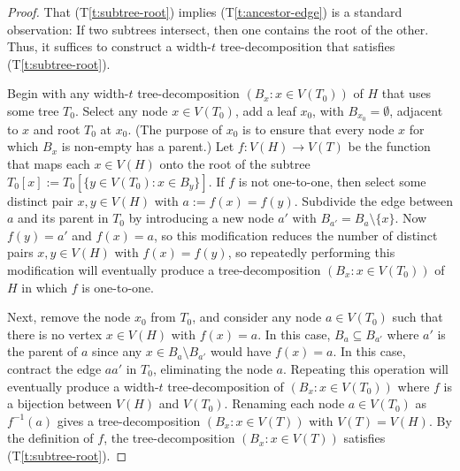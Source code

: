 \documentclass{patmorin}
\theoremstyle{plain}
\theoremstyle{definition}
\newcommand{\tref}[1]{(T\ref{t:#1})}
\begin{document}
\begin{proof}
  That \tref{subtree-root} implies \tref{ancestor-edge} is a standard observation: If two subtrees intersect, then one contains the root of the other.  Thus, it suffices to construct a width-$t$ tree-decomposition that satisfies \tref{subtree-root}.

  Begin with any width-$t$ tree-decomposition $(B_x:x\in V(T_0))$ of $H$ that uses some tree $T_0$.  Select any node $x\in V(T_0)$, add a leaf $x_0$, with $B_{x_0}=\emptyset$, adjacent to $x$ and root $T_0$ at $x_0$. (The purpose of $x_0$ is to ensure that every node $x$ for which $B_x$ is non-empty has a parent.)  Let $f:V(H)\to V(T)$ be the function that maps each $x\in V(H)$ onto the root of the subtree $T_0[x]:=T_0[\{y\in V(T_0): x\in B_y\}]$.  If $f$ is not one-to-one, then select some distinct pair $x,y\in V(H)$ with $a:=f(x)=f(y)$.  Subdivide the edge between $a$ and its parent in $T_0$ by introducing a new node $a'$ with $B_{a'}=B_{a}\setminus\{x\}$. Now $f(y)=a'$ and $f(x)=a$, so this modification reduces the number of distinct pairs $x,y\in V(H)$ with $f(x)=f(y)$, so repeatedly performing this modification will eventually produce a tree-decomposition $(B_x:x\in V(T_0))$ of $H$ in which $f$ is one-to-one.

  Next, remove the node $x_0$ from $T_0$, and consider any node $a\in V(T_0)$ such that there is no vertex $x\in V(H)$ with $f(x)=a$.  In this case, $B_{a}\subseteq B_{a'}$ where $a'$ is the parent of $a$ since any $x\in B_a\setminus B_{a'}$ would have $f(x)=a$.  In this case, contract the edge $aa'$ in $T_0$, eliminating the node $a$.  Repeating this operation will eventually produce a width-$t$ tree-decomposition of $(B_x:x\in V(T_0))$ where $f$ is a bijection between $V(H)$ and $V(T_0)$.  Renaming each node $a\in V(T_0)$ as $f^{-1}(a)$ gives a tree-decomposition $(B_x:x\in V(T))$ with $V(T)=V(H)$.  By the definition of $f$, the tree-decomposition $(B_x:x\in V(T))$ satisfies \tref{subtree-root}.
\end{proof}
\end{document}
